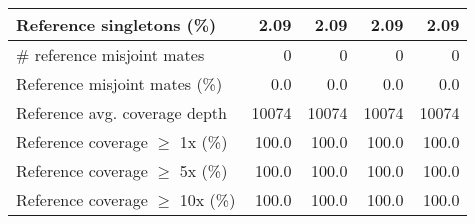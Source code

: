 \documentclass[12pt,a4paper]{article}
\begin{document}
\begin{table}[ht]
\begin{center}
\begin{tabular}{|l*{4}{|r}|}
Reference singletons (\%) & 2.09 & 2.09 & 2.09 & 2.09 \\ \hline
\# reference misjoint mates & 0 & 0 & 0 & 0 \\ \hline
Reference misjoint mates (\%) & 0.0 & 0.0 & 0.0 & 0.0 \\ \hline
Reference avg. coverage depth & 10074 & 10074 & 10074 & 10074 \\ \hline
Reference coverage $\geq$ 1x (\%) & 100.0 & 100.0 & 100.0 & 100.0 \\ \hline
Reference coverage $\geq$ 5x (\%) & 100.0 & 100.0 & 100.0 & 100.0 \\ \hline
Reference coverage $\geq$ 10x (\%) & 100.0 & 100.0 & 100.0 & 100.0 \\ \hline
\end{tabular}
\end{center}
\end{table}
\end{document}
